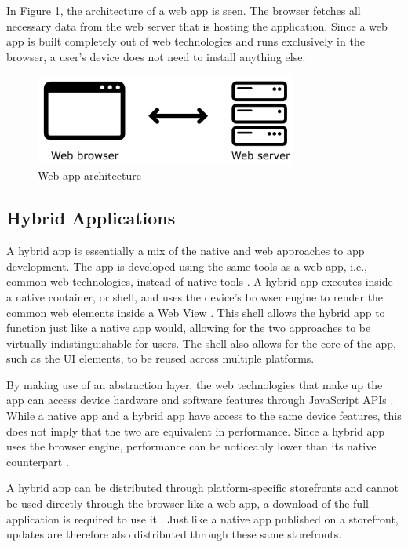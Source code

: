 \documentclass[a4paper,12pt]{article}
\begin{document}
In Figure \ref{fig:webapp}, the architecture of a web app is seen. The browser fetches all necessary data from the web server that is hosting the application. Since a web app is built completely out of web technologies and runs exclusively in the browser, a user’s device does not need to install anything else.

\begin{figure}[h]%
	\centering
	\includegraphics[height=3cm]{img/Other/struct_webapp.png}
	\caption{Web app architecture}%
	\label{fig:webapp}%
\end{figure}

\subsection{Hybrid Applications}
\label{Theory_hybridApps}
A hybrid app is essentially a mix of the native and web approaches to app development. The app is developed using the same tools as a web app, i.e., common web technologies, instead of native tools \cite{mobile_web_apps_2013}. A hybrid app executes inside a native container, or shell, and uses the device’s browser engine to render the common web elements inside a Web View \cite{crossplatform_2012}. This shell allows the hybrid app to function just like a native app would, allowing for the two approaches to be virtually indistinguishable for users. The shell also allows for the core of the app, such as the UI elements, to be reused across multiple platforms.

By making use of an abstraction layer, the web technologies that make up the app can access device hardware and software features through JavaScript APIs \cite{crossplatform_2012}. While a native app and a hybrid app have access to the same device features, this does not imply that the two are equivalent in performance. Since a hybrid app uses the browser engine, performance can be noticeably lower than its native counterpart \cite{crossplatform_taxonomy, crossplatform_2012}.

A hybrid app can be distributed through platform-specific storefronts and cannot be used directly through the browser like a web app, a download of the full application is required to use it \cite{crossplatform_2012, mobile_web_apps_2013}. Just like a native app published on a storefront, updates are therefore also distributed through these same storefronts.
\end{document}
